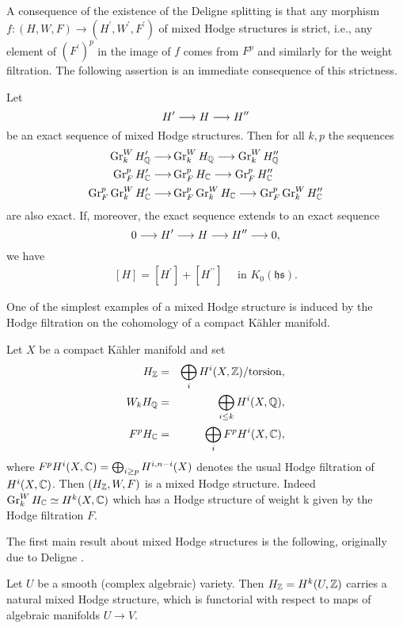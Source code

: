 \documentclass[../main.tex]{subfiles}
\begin{document}
A consequence of the existence of the Deligne splitting is that any morphism $f \colon (H,W,F) \to (H^\prime,W^\prime,F^\prime)$ of mixed Hodge structures is strict, i.e., any element of $(F^\prime)^p$ in the image of $f$ comes from $F^p$ and similarly for the weight filtration.
The following assertion is an immediate consequence of this strictness.
\begin{cor} \label{SummGrses}
     Let
     \[
H^\prime \longrightarrow H \longrightarrow H^{\prime\prime}
     \]
be an exact sequence of mixed Hodge structures. Then for all $k,p$ the sequences
\begin{align*}
\operatorname{Gr}^W_k H^\prime_{\mathbb{Q}} \longrightarrow &\operatorname{Gr}^W_k H_{\mathbb{Q}} \longrightarrow \operatorname{Gr}^W_k H^{\prime\prime}_{\mathbb{Q}} \\
\operatorname{Gr}^p_F H^\prime_{\mathbb{C}} \longrightarrow &\operatorname{Gr}^p_F H_{\mathbb{C}} \longrightarrow \operatorname{Gr}^p_F H^{\prime\prime}_{\mathbb{C}} \\
\operatorname{Gr}^p_F \operatorname{Gr}^W_k H^\prime_{\mathbb{C}} \longrightarrow & \operatorname{Gr}^p_F \operatorname{Gr}^W_k H_{\mathbb{C}} \longrightarrow \operatorname{Gr}^p_F \operatorname{Gr}^W_k H^{\prime\prime}_{\mathbb{C}}
\end{align*}
are also exact. If, moreover, the exact sequence extends to an exact sequence
\[
0 \longrightarrow H^\prime \longrightarrow H \longrightarrow H^{\prime\prime} \longrightarrow 0,
     \]
we have
\begin{align} \label{sumses}
[H] = [H^\prime] + [H^{\prime\prime}] \quad \text{ in } K_0(\mathfrak{hs}).
\end{align}
\end{cor} 

One of the simplest examples of a mixed Hodge structure is induced by the Hodge filtration on the cohomology of a compact K\"{a}hler manifold.

\begin{es} 
\label{example-MHS1}
Let $X$ be a compact K\"ahler manifold and set 
\begin{eqnarray*}
H_{\mathbb{Z}} &=& \bigoplus_i H^i(X,\mathbb{Z})/\mathrm{torsion},\\
W_kH_{\mathbb{Q}} &=& \bigoplus_{i\le k} H^i(X,\mathbb{Q}),\\
F^pH_{\mathbb{C}} &=& \bigoplus_{i} F^pH^i(X,\mathbb{C}),
\end{eqnarray*}
where $F^pH^i(X,\mathbb{C}) = \bigoplus_{i\geq p} H^{i,n-i}(X) $ denotes the usual Hodge filtration of $H^i(X,\mathbb{C})$. Then $(H_{\mathbb{Z}},W,F)$ is a mixed Hodge structure. Indeed $\operatorname{Gr}^W_k H_{\mathbb{C}} \simeq H^k(X,\mathbb{C})$ which has a Hodge structure of weight k given by the Hodge filtration $F$.
\end{es}

The first main result about mixed Hodge structures is the following, originally due to Deligne \cite{Del71}.

\begin{theorem}\textup{\cite{Del71}}
\label{deligne-on-smooth}
Let $U$ be a smooth \textup{(}complex algebraic\textup{)}  variety. Then $H_{\mathbb{Z}}=H^k(U,\mathbb{Z})$ carries a natural mixed Hodge structure, which is functorial with respect to maps of algebraic manifolds $U \to V$.
\end{theorem}
\end{document}
